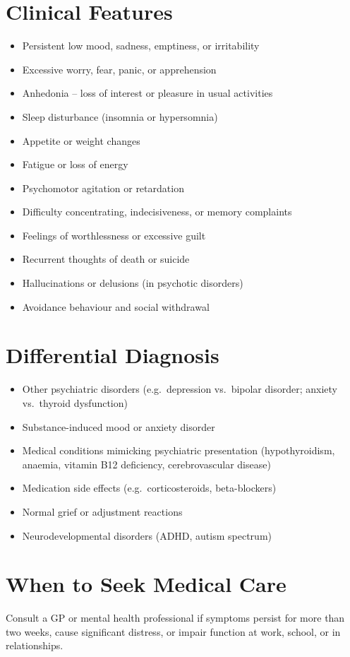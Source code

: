 \section*{Clinical Features}
\begin{itemize}
    \item Persistent low mood, sadness, emptiness, or irritability
    \item Excessive worry, fear, panic, or apprehension
    \item Anhedonia -- loss of interest or pleasure in usual activities
    \item Sleep disturbance (insomnia or hypersomnia)
    \item Appetite or weight changes
    \item Fatigue or loss of energy
    \item Psychomotor agitation or retardation
    \item Difficulty concentrating, indecisiveness, or memory complaints
    \item Feelings of worthlessness or excessive guilt
    \item Recurrent thoughts of death or suicide
    \item Hallucinations or delusions (in psychotic disorders)
    \item Avoidance behaviour and social withdrawal
\end{itemize}

\section*{Differential Diagnosis}
\begin{itemize}
    \item Other psychiatric disorders (e.g.\ depression vs.\ bipolar disorder; anxiety vs.\ thyroid dysfunction)
    \item Substance-induced mood or anxiety disorder
    \item Medical conditions mimicking psychiatric presentation (hypothyroidism, anaemia, vitamin B12 deficiency, cerebrovascular disease)
    \item Medication side effects (e.g.\ corticosteroids, beta-blockers)
    \item Normal grief or adjustment reactions
    \item Neurodevelopmental disorders (ADHD, autism spectrum)
\end{itemize}

\section*{When to Seek Medical Care}
Consult a GP or mental health professional if symptoms persist for more than two weeks, cause significant distress, or impair function at work, school, or in relationships.

